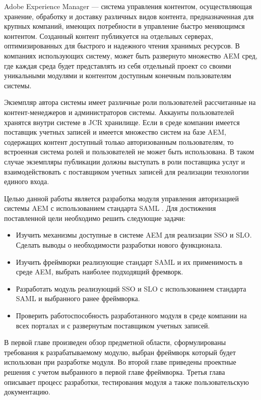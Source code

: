 \Introduction

Adobe Experience Manager — система управления контентом, осуществляющая хранение, обработку и доставку различных видов контента, предназначенная для крупных компаний, имеющих потребности в управление быстро меняющимся контентом. Созданный контент публикуется на отдельных серверах, оптимизированных для быстрого и надежного чтения хранимых ресурсов. В компаниях использующих систему, может быть развернуто множество AEM сред, где каждая среда будет представлять из себя отдельный проект со своими уникальными модулями и контентом доступным конечным пользователям системы. 

Экземпляр автора системы имеет различные роли пользователей рассчитанные на контент-менеджеров и администраторов системы. Аккаунты пользователей хранятся внутри системе в JCR хранилище. Если в среде компании имеется поставщик учетных записей и имеется множество систем на базе AEM, содержащих контент доступный только авторизованным пользователям, то встроенная система ролей и пользователей не может быть использована. В таком случае экземпляры публикации должны выступать в роли поставщика услуг и взаимодействовать с поставщиком учетных записей для реализации технологии единого входа.

Целью данной работы является разработка модуля управления авторизацией системы AEM с использованием стандарта SAML \cite{web:wikiSaml}. Для достижения поставленной цели необходимо решить следующие задачи:

\begin{itemize}
\item Изучить механизмы доступные в системе AEM для реализации SSO и SLO. Сделать выводы о необходимости разработки нового функционала.
\item Изучить фреймворки реализующие стандарт SAML и их применимость в среде AEM, выбрать наиболее подходящий фремворк.
\item Разработать модуль реализующий SSO и SLO с использованием стандарта SAML и выбранного ранее фреймворка.
\item Проверить работоспособность разработанного модуля в среде компании на всех порталах и с развернутым поставщиком учетных записей.
\end{itemize}

В первой главе произведен обзор предметной области, сформулированы требования к разрабатываемому модулю, выбран фреймворк который будет использован при разработке модуля. Во второй главе приведены проектные решения с учетом выбранного в первой главе фреймворка. Третья глава описывает процесс разработки, тестирования модуля а также пользовательскую документацию.